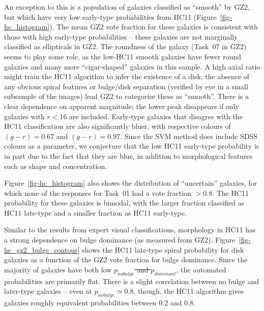 \documentclass[useAMS,usenatbib]{mn2e}
\providecommand{\DIFaddtex}[1]{{\protect\color{blue}\uwave{#1}}} %
\providecommand{\DIFdeltex}[1]{{\protect\color{red}\sout{#1}}}                      %
\providecommand{\DIFaddbegin}{} %
\providecommand{\DIFaddend}{} %
\providecommand{\DIFdelbegin}{} %
\providecommand{\DIFdelend}{} %
\providecommand{\DIFadd}[1]{\texorpdfstring{\DIFaddtex{#1}}{#1}} %
\providecommand{\DIFdel}[1]{\texorpdfstring{\DIFdeltex{#1}}{}} %
\begin{document}
An exception to this is a population of galaxies classified as ``smooth'' by GZ2, but which have very low early-type probabilities from HC11 (Figure~\ref{fig-hc_histogram}). The mean GZ2 vote fraction for these galaxies is consistent with those with high early-type probabilities -- these galaxies are not marginally classified as ellipticals in GZ2. The roundness of the galaxy (Task~07 in GZ2) seems to play some role, as the low-HC11 smooth galaxies have fewer round galaxies and many more ``cigar-shaped'' galaxies in this sample. A high axial ratio might train the HC11 algorithm to infer the existence of a disk; the absence of any obvious spiral features or bulge/disk separation (verified by eye in a small subsample of the images) lead GZ2 to categorise these as ``smooth''. There is a clear dependence on apparent magnitude; the lower peak disappears if only galaxies with $r<16$ are included. Early-type galaxies that disagree with the HC11 classification are also significantly bluer, with respective colours of $(g-r)=0.67$ and $(g-r)=0.97$. Since the SVM method does include SDSS colours as a parameter, we conjecture that the low HC11 early-type probability is in part due to the fact that they are blue, in addition to morphological features such as shape and concentration. %

Figure~\ref{fig-hc_histogram} also shows the distribution of ``uncertain'' galaxies, for which none of the responses for Task~01 had a vote fraction $>0.8$. The HC11 probability for these galaxies is bimodal, with the larger fraction classified as HC11 late-type and a smaller fraction as HC11 early-type. 

Similar to the results from expert visual classifications, morphology in HC11 has a strong dependence on bulge dominance (as measured from GZ2). Figure~\ref{fig-hc_gz2_bulge_contour} shows the HC11 late-type spiral probability for disk galaxies as a function of the GZ2 vote fraction for bulge dominance. Since the majority of galaxies have both low \DIFdelbegin \DIFdel{$p_{no bulge}$ and $p_{dominant}$}\DIFdelend \DIFaddbegin \DIFadd{$p_\mathrm{no bulge}$ and $p_\mathrm{dominant}$}\DIFaddend , the automated probabilities are primarily flat. There is a slight correlation between no bulge and later-type galaxies -- even at \DIFdelbegin \DIFdel{$p_{no bulge}\simeq0.8$}\DIFdelend \DIFaddbegin \DIFadd{$p_\mathrm{no bulge}\simeq0.8$}\DIFaddend , though, the HC11 algorithm gives galaxies roughly equivalent probabilities between 0.2 and 0.8. 
\end{document}
